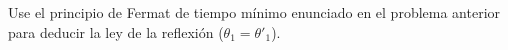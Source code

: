 \item Use el principio de Fermat de tiempo mínimo enunciado en el problema anterior para deducir la ley de la reflexión ($\theta_1 = \theta'_1$).